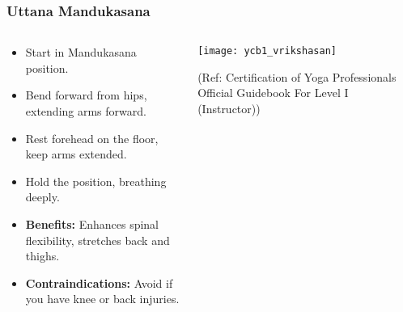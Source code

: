 \begin{frame}[fragile]\frametitle{Uttana Mandukasana}
\begin{columns}
    \begin{column}[T]{0.5\linewidth}
      \begin{itemize}
        \item Start in Mandukasana position.
        \item Bend forward from hips, extending arms forward.
        \item Rest forehead on the floor, keep arms extended.
        \item Hold the position, breathing deeply.
        \item \textbf{Benefits:} Enhances spinal flexibility, stretches back and thighs.
        \item \textbf{Contraindications:} Avoid if you have knee or back injuries.
      \end{itemize}
    \end{column}
    \begin{column}[T]{0.5\linewidth}
        \begin{center}
        \begin{center}
		        \texttt{[image: ycb1\_vrikshasan]}
				
				{\tiny (Ref: Certification  of Yoga Professionals Official Guidebook For Level I (Instructor))}	        
		\end{center}   
        \end{center}    
    \end{column}
  \end{columns}
\end{frame}

